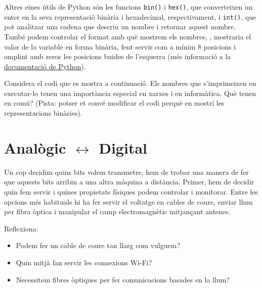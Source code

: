 Altres eines útils de Python són les funcions \texttt{bin()} i \texttt{hex()}, que converteixen un enter 
en la seva representació binària i hexadecimal, respectivament, i \texttt{int()}, que pot analitzar
una cadena que descriu un nombre i retornar aquest nombre. També podem controlar el format amb què mostrem els nombres,
\eg,  mostraria el valor de la variable  en forma binària, 
fent servir com a mínim 8 posicions i omplint amb zeros les posicions buides de l'esquerra
(més informació a la \href{https://docs.python.org/3/reference/lexical_analysis.html#f-strings}{documentació de Python}).

\begin{exercise}
Considera el codi que es mostra a continuació. Els nombres que s'imprimeixen en executar-lo tenen una importància especial en xarxes i en informàtica.
Què tenen en comú? (Pista: potser et convé modificar el codi perquè en mostri les representacions binàries).

\begin{center}
\end{center}
\label{ex:bitwisemanipulation}
\end{exercise}

\section{Analògic $\leftrightarrow$ Digital}\label{sec:piercing:analog_digital}

Un cop decidim quins bits volem transmetre, hem de trobar una manera de fer que aquests bits arribin a una altra màquina a distància.
Primer, hem de decidir quin  fem servir i quines propietats físiques podem controlar i monitorar.
Entre les opcions més habituals hi ha fer servir el voltatge en cables de coure, enviar llum per fibra òptica i manipular el 
camp electromagnètic mitjançant antenes.

\begin{exercise} Reflexiona:\\[-0.5cm]
\begin{itemize}
\item Podem fer un cable de coure tan llarg com vulguem?
\item Quin mitjà fan servir les connexions Wi-Fi? 
\item Necessitem fibres òptiques per fer comunicacions basades en la llum?
\end{itemize}
\end{exercise}


